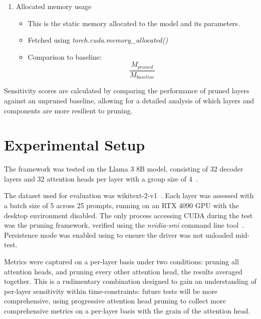 \documentclass[conference]{IEEEtran}
\begin{document}
\begin{enumerate}
\begin{itemize}
        \end{itemize}
        \item Allocated memory usage
        \begin{itemize}
            \item This is the static memory allocated to the model and its parameters.
            \item Fetched using \textit{torch.cuda.memory\_allocated()}
            \item Comparison to baseline:
            \\
            \begin{equation}
                \frac{M_{pruned}}{M_{baseline}}
                \label{eq:memory_time_comparison}
            \end{equation}
        \end{itemize}
    \end{enumerate}

    Sensitivity scores are calculated by comparing the performance of pruned layers against an unpruned baseline, allowing for a detailed analysis of which layers and components are more resilient to pruning.

    \section{Experimental Setup}
    The framework was tested on the Llama 3 8B model, consisting of 32 decoder layers and 32 attention heads per layer with a group size of 4~\cite{grattafiori2024llama3herdmodels}.

    The dataset used for evaluation was wikitext-2-v1~\cite{merity2016pointersentinelmixturemodels}.
    Each layer was assessed with a batch size of 5 across 25 prompts, running on an RTX 4090 GPU with the desktop environment disabled.
    The only process accessing CUDA during the test was the pruning framework, verified using the \textit{nvidia-smi} command line tool~\cite{nvidia_smi}.
    Persistence mode was enabled using  to ensure the driver was not unloaded mid-test.

    Metrics were captured on a per-layer basis under two conditions: pruning all attention heads, and pruning every other attention head, the results averaged together.
    This is a rudimentary combination designed to gain an understanding of per-layer sensitivity within time-constraints: future tests will be more comprehensive, using progressive attention head pruning to collect more comprehensive metrics on a per-layer basis with the grain of the attention head.
\end{document}
